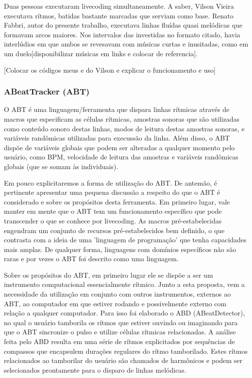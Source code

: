 Duas pessoas executaram livecoding simultaneamente. A saber, Vilson Vieira executava
rítmos, batidas bastante marcadas que serviam como base. Renato Fabbri, autor do presente
trabalho, executava linhas fluídas quasi melódicas que formavam arcos maiores. Nos intervalos
das investidas no formato citado, havia interlúdios em que ambos se revesavam com músicas
curtas e inusitadas, como em um duelo[disponibilizar músicas em links e colocar de referencia].

[Colocar os códigos meus e do Vilson e explicar o funcionamento e uso]





      \subsubsection{ABeatTracker (ABT)}
O ABT é uma linguagem/ferramenta que dispara linhas rítmicas através de macros que especificam
as células rítmicas, amostras sonoras que são utilizadas como conteúdo sonoro destas
linhas, modos de leitura destas amostras sonoras, e variáveis randômicas utilizadas
para execussão da linha. Além disso, o ABT dispõe de variáveis globais que podem ser alteradas
a qualquer momento pelo usuário, como BPM, velocidade de leitura das amostras e variáveis
randômicas globais (que se somam às individuais).

Em pouco explicitaremos a forma de utilização do ABT. De antemão, é pertinente apresentar
uma pequena discussão a respeito do que o ABT é considerado e sobre os propósitos desta
ferramenta. Em primeiro lugar, vale manter em mente que o ABT tem um funcionamento específico
que pode transcender o que se conhece por livecoding. As macros pré-estabelecidas engendram um
conjunto de recursos pré-estabelecidos bem definido, o que contrasta com a ideia de uma 'linguagem
de programação' que tenha capacidades mais amplas. De qualquer forma, linguagens com domínios
específicos não são raras e por vezes o ABT foi descrito como uma linguagem.

Sobre os propósitos do ABT, em primeiro lugar ele se dispõe a ser um instrumento computacional
essencialmente rítmico. Junto a esta proposta, vem a necessidade da utilização em conjunto com
outros instrumentos, externos ao ABT, ao computador em que estiver rodando e possivelmente externo
com relação a qualquer computador. Para isso foi elaborado o ABD (ABeatDetector), no qual o usuário
tamborila os rítmos que estiver ouvindo ou imaginando para que o ABT sincronize o pulso e utilize
células rítmicas relacionadas. A análise feita pelo ABD resulta em uma série de rítmos explicitados
por sequências de compassos que encapsulem durações regulares do rítmo tamborilado. Estes rítmos
relacionados ao tamborilar do usuário são chamados de harmônicos e podem ser selecionados
prontamente para o disparo de linhas melódicas.

